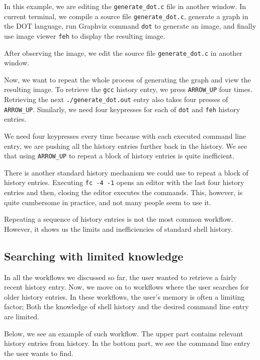 In this example, we are editing the \verb|generate_dot.c| file in another window. In current terminal, we compile a source file \verb|generate_dot.c|, generate a graph in the DOT\cite{graphvizthedotlanguage} language, run Graphviz\cite{ellson2001graphviz} command \verb|dot| to generate an image, and finally use image viewer \verb|feh|\cite{toolsfeh} to display the resulting image.

After observing the image, we edit the source file \verb|generate_dot.c| in another window.


Now, we want to repeat the whole process of generating the graph and view the resulting image. To retrieve the \verb|gcc| history entry, we press \verb|ARROW_UP| four times. Retrieving the next \verb|./generate_dot.out| entry also takes four presses of \verb|ARROW_UP|. Similarly, we need four keypresses for each of \verb|dot| and \verb|feh| history entries. 

We need four keypresses every time because with each executed command line entry, we are pushing all the history entries further back in the history. We see that using \verb|ARROW_UP| to repeat a block of history entries is quite inefficient. 

There is another standard history mechanism we could use to repeat a block of history entries. 
Executing \verb|fc -4 -1| opens an editor with the last four history entries and then, closing the editor executes the commands. This, however, is quite cumbersome in practice, and not many people seem to use it. 


Repeating a sequence of history entries is not the most common workflow. However, it shows us the limits and inefficiencies of standard shell history.


\subsection{Searching with limited knowledge}\label{workflow-search-w-limited-knowledge}

In all the workflows we discussed so far, the user wanted to retrieve a fairly recent history entry. Now, we move on to workflows where the user searches for older history entries. In these workflows, the user's memory is often a limiting factor; Both the knowledge of shell history and the desired command line entry are limited.

Below, we see an example of such workflow. The upper part contains relevant history entries from history. In the bottom part, we see the command line entry the user wants to find. 

